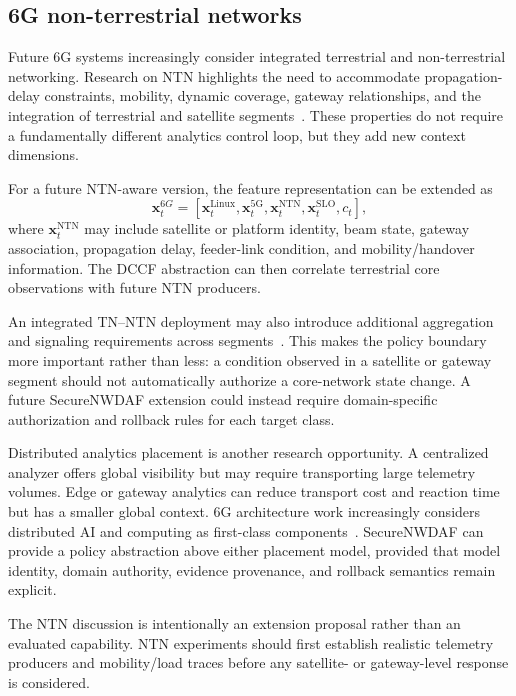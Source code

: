 \documentclass[sigconf,review]{acmart}
\begin{document}
\subsection{6G non-terrestrial networks}
Future 6G systems increasingly consider integrated terrestrial and non-terrestrial networking. Research on NTN highlights the need to accommodate propagation-delay constraints, mobility, dynamic coverage, gateway relationships, and the integration of terrestrial and satellite segments~\cite{ntn5gspace,ntnrel17,ntn6g,role6gntn}. These properties do not require a fundamentally different analytics control loop, but they add new context dimensions.

For a future NTN-aware version, the feature representation can be extended as
\begin{equation}
\mathbf{x}^{6G}_t=
[\mathbf{x}^{\mathrm{Linux}}_t,\mathbf{x}^{\mathrm{5G}}_t,
\mathbf{x}^{\mathrm{NTN}}_t,\mathbf{x}^{\mathrm{SLO}}_t,c_t],
\end{equation}
where $\mathbf{x}^{\mathrm{NTN}}_t$ may include satellite or platform identity, beam state, gateway association, propagation delay, feeder-link condition, and mobility/handover information. The DCCF abstraction can then correlate terrestrial core observations with future NTN producers.

An integrated TN--NTN deployment may also introduce additional aggregation and signaling requirements across segments~\cite{multintn}. This makes the policy boundary more important rather than less: a condition observed in a satellite or gateway segment should not automatically authorize a core-network state change. A future SecureNWDAF extension could instead require domain-specific authorization and rollback rules for each target class.

Distributed analytics placement is another research opportunity. A centralized analyzer offers global visibility but may require transporting large telemetry volumes. Edge or gateway analytics can reduce transport cost and reaction time but has a smaller global context. 6G architecture work increasingly considers distributed AI and computing as first-class components~\cite{perspectives6g}. SecureNWDAF can provide a policy abstraction above either placement model, provided that model identity, domain authority, evidence provenance, and rollback semantics remain explicit.

The NTN discussion is intentionally an extension proposal rather than an evaluated capability. NTN experiments should first establish realistic telemetry producers and mobility/load traces before any satellite- or gateway-level response is considered.
\end{document}
